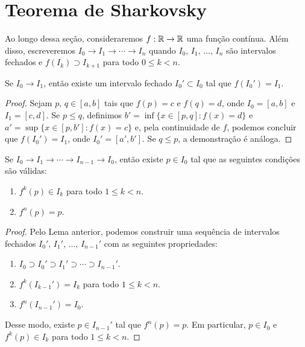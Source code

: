 \section{Teorema de Sharkovsky}

Ao longo dessa seção, consideraremos $f: \mathbb{R} \to \mathbb{R}$ uma função contínua.
Além disso, escreveremos $I_0 \longrightarrow I_1 \longrightarrow \cdots \longrightarrow I_n$ quando $I_0, \, I_1, \, \dots, \, I_n$ são intervalos fechados e $f(I_k) \supset I_{k+1}$ para todo $0 \leq k < n$.

\begin{lemma}
Se $I_0 \longrightarrow I_1$, então existe um intervalo fechado $I_0' \subset I_0$ tal que $f(I_0') = I_1$.
\end{lemma}

\begin{proof}
Sejam $p, \, q \in [a, b]$ tais que $f(p) = c$ e $f(q) = d$, onde $I_0 = [a, b]$ e $I_1 = [c, d]$.
Se $p \leq q$, definimos $b' = \inf \lbrace x \in [p, q] : f(x) = d \rbrace$ e $a' = \sup \lbrace x \in [p, b'] : f(x) = c \rbrace$ e, pela continuidade de $f$, podemos concluir que $f(I_0') = I_1$, onde $I_0' = [a', b']$.
Se $q \leq p$, a demonstração é análoga.
\end{proof}

\begin{lemma}
Se $I_0 \longrightarrow I_1 \longrightarrow \cdots \longrightarrow I_{n-1} \longrightarrow I_0$, então existe $p \in I_0$ tal que as seguintes condições são válidas:
\begin{enumerate}
\item $f^k(p) \in I_k$ para todo $1 \leq k < n$.
\item $f^n(p) = p$.
\end{enumerate}
\end{lemma}

\begin{proof}
Pelo Lema anterior, podemos construir uma sequência de intervalos fechados $I_0', \, I_1', \, \dots, \, I_{n-1}'$ com as seguintes propriedades:
\begin{enumerate}[label=\alph*.]
\item $I_0 \supset I_0' \supset I_1' \supset \cdots \supset I_{n-1}'$.
\item $f^k(I_{k-1}') = I_k$ para todo $1 \leq k < n$.
\item $f^n(I_{n-1}') = I_0$.
\end{enumerate}

Desse modo, existe $p \in I_{n-1}'$ tal que $f^n(p) = p$.
Em particular, $p \in I_0$ e $f^k(p) \in I_k$ para todo $1 \leq k < n$.
\end{proof}

